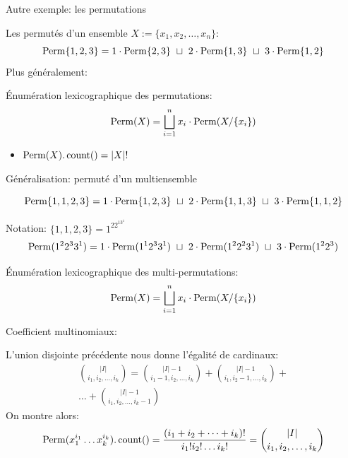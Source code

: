 \documentclass{beamer}
\begin{document}
\begin{frame}{Autre exemple: les permutations}

  Les permutés d'un ensemble $X := \{x_1, x_2, \dots, x_n\}$:
  $$\Perm\{1,2,3\} = 
  1\cdot\Perm\{2,3\}\ \sqcup\ 
  2\cdot\Perm\{1,3\}\ \sqcup\ 
  3\cdot\Perm\{1,2\}
  $$
  Plus généralement:
  \begin{NOTE}
    Énumération lexicographique des permutations:
    $$
    \operatorname{Perm}(X) = \bigsqcup_{i=1}^{n} x_i\cdot\operatorname{Perm}(X/\{x_i\})
    $$
  \end{NOTE}
  \begin{itemize}
  \item $\operatorname{Perm}(X).\operatorname{count}() = |X|!$
  \end{itemize}
\end{frame}

\begin{frame}{Généralisation: permuté d'un multiensemble}

  $$\operatorname{Perm}\{1,1,2,3\} =
  1\cdot\operatorname{Perm}\{1,2,3\}\ \sqcup\
  2\cdot\operatorname{Perm}\{1,1,3\}\ \sqcup\
  3\cdot\operatorname{Perm}\{1,1,2\}
  $$
  \bigskip

  Notation: $\{1,1,2,3\} = 1^22^13^1$
  $$\operatorname{Perm}(1^22^33^1) =
  1\cdot\operatorname{Perm}(1^12^33^1)\ \sqcup\
  2\cdot\operatorname{Perm}(1^22^23^1)\ \sqcup\
  3\cdot\operatorname{Perm}(1^22^3)
  $$

  \begin{NOTE}
    Énumération lexicographique des multi-permutations:
    $$
    \operatorname{Perm}(X) = \bigsqcup_{i=1}^{n} x_i\cdot\operatorname{Perm}(X/\{x_i\})
    $$
  \end{NOTE}
\end{frame}

\begin{frame}{Coefficient multinomiaux:}

  L'union disjointe précédente nous donne l'égalité de cardinaux:
  \begin{multline*}
    \binom{|I|}{i_1,i_2,\dots,i_k} = \binom{|I|-1}{i_1-1,i_2,\dots,i_k} +
    \binom{|I|-1}{i_1,i_2-1,\dots,i_k} + \\ \dots +
    \binom{|I|-1}{i_1,i_2,\dots,i_k-1}
  \end{multline*}
  \pause\smallskip
  On montre alors:
  \[
  \operatorname{Perm}(x_1^{i_1}\dots x_k^{i_k}).\operatorname{count}() = 
  \frac{(i_1+i_2+\dots+i_k)!}{i_1!i_2!\dots i_k!} =
  \binom{|I|}{i_1,i_2,\dots,i_k}
  \]
\end{frame}
\end{document}
